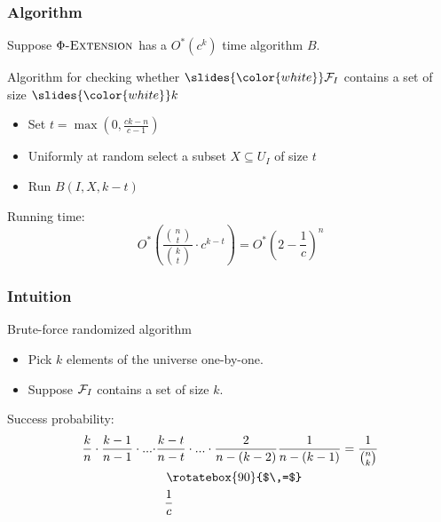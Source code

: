\begin{frame}[c]\frametitle{Algorithm}
    
    Suppose $\textsc{$\Phi$-Ex\-ten\-sion}$ has a $O^*(c^k)$ time algorithm $B$.

    \begin{block}{Algorithm for checking whether $\slides{\color{white}}\mcF_I$ contains a set of size $\slides{\color{white}}k$}
        \begin{itemize}
            \item Set $t = \max \left( 0, \frac{ck - n}{c - 1} \right)$
            \item Uniformly at random select a subset $X \subseteq U_I$ of size $t$
            \item Run $B(I,X,k-t)$
        \end{itemize}
    \end{block}
    \pause

    Running time: \cite{FominGLS19}
    \[ O^* \left( \frac{\binom{n}{t}}{\binom{k}{t}} \cdot c^{k-t} \right) = O^*\left( 2 - \frac{1}{c} \right)^n \]

\end{frame}

\begin{frame}[c]\frametitle{Intuition}
    
    \begin{block}{Brute-force randomized algorithm}
        \begin{itemize}
            \item Pick $k$ elements of the universe one-by-one.\\
            \item Suppose $\mathcal{F}_I$ contains a set of size $k$.\\
        \end{itemize}
        
        Success probability:
        \begin{align*}
            \frac{k}{n} \cdot \frac{k-1}{n-1} \cdot ... \cdot &\frac{k-t}{n-t} \cdot ... \cdot \frac{2}{n - (k-2)}\frac{1}{n-(k-1)} = \frac{1}{\binom{n}{k}} \\
            & ~~\,\rotatebox{90}{$\,=$}\\
            & ~~\frac{1}{c}
        \end{align*}    
    \end{block}

\end{frame}



